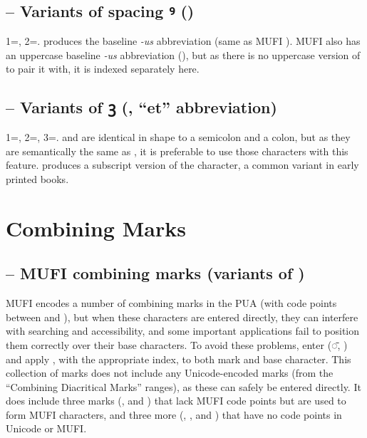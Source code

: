 \subsection{ -- Variants of spacing ꝰ ()}
1=, 2=.  produces the baseline \textit{{}-us} abbreviation (same as MUFI
). MUFI also has an uppercase baseline \textit{{}-us} abbreviation (), but as there is no uppercase version
of  to pair it with, it is indexed separately here.

\subsection{ -- Variants of ꝫ (, ``et'' abbreviation)}
1=, 2=, 3=. \textSourceText{[1]} and \textSourceText{[3]} are
identical in shape to a semicolon and a colon, but as they are semantically the same as ,
it is preferable to use those
characters with this feature. \textSourceText{[2]} produces a subscript version of
the character, a common variant in early printed books.

\section{Combining Marks}
\subsection{ -- MUFI combining marks (variants of )}
MUFI encodes a number of combining marks in the PUA (with code points between  and ), but when these characters
are entered directly, they can interfere with searching and accessibility, and some important applications fail to
position them correctly over their base characters. To avoid these problems, enter  (◌̄, ) and apply , with the appropriate index, to both mark and base character. This
collection of marks does not include any Unicode-encoded marks (from the ``Combining Diacritical Marks'' ranges), as
these can safely be entered directly. It does include three marks (,
\textSourceText{[31]} and \textSourceText{[32]}) that lack MUFI code points but are used to form MUFI
characters, and three more (\textSourceText{[2]}, \textSourceText{[33]},
and \textSourceText{[34]}) that have no code points in Unicode or MUFI.

